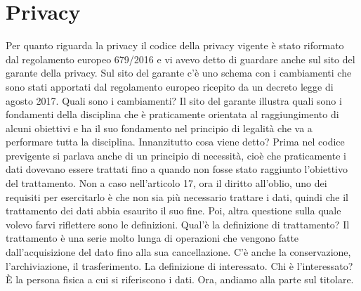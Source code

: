 \chapter{Privacy}

Per quanto riguarda la privacy il codice della privacy vigente è stato riformato dal regolamento europeo 679/2016 e vi avevo detto di guardare anche sul sito del garante della privacy.
Sul sito del garante c'è uno schema con i cambiamenti che sono stati apportati dal regolamento europeo ricepito da un decreto legge di agosto 2017.
Quali sono i cambiamenti?
Il sito del garante illustra quali sono i fondamenti della disciplina che è praticamente orientata al raggiungimento di alcuni obiettivi e ha il suo fondamento nel principio di legalità che va a performare tutta la disciplina.
Innanzitutto cosa viene detto?
Prima nel codice previgente si parlava anche di un principio di necessità, cioè che praticamente i dati dovevano essere trattati fino a quando non fosse stato raggiunto l'obiettivo del trattamento.
Non a caso nell'articolo 17, ora il diritto all'oblio, uno dei requisiti per esercitarlo è che non sia più necessario trattare i dati, quindi che il trattamento dei dati abbia esaurito il suo fine.
Poi, altra questione sulla quale volevo farvi riflettere sono le definizioni.
Qual'è la definizione di trattamento?
Il trattamento è una serie molto lunga di operazioni che vengono fatte dall'acquisizione del dato fino alla sua cancellazione. C'è anche la conservazione, l'archiviazione, il trasferimento.
La definizione di interessato. Chi è l'interessato?
È la persona fisica a cui si riferiscono i dati.
Ora, andiamo alla parte sul titolare.


